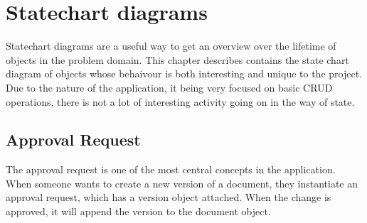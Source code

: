 \section{Statechart diagrams}
Statechart diagrams are a useful way to get an overview over the lifetime of objects in the problem domain.
This chapter describes contains the state chart diagram of objects whose behaivour is both interesting and unique to the project.
Due to the nature of the application, it being very focused on basic CRUD operations, there is not a lot of interesting activity going on in the way of state.
\subsection{Approval Request}
The approval request is one of the most central concepts in the application.
When someone wants to create a new version of a document, they instantiate an approval request, which has a version object attached.
When the change is approved, it will append the version to the document object.

